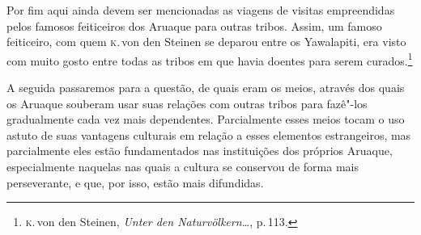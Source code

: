 Por fim aqui ainda devem ser mencionadas as viagens de visitas
empreendidas pelos famosos feiticeiros dos Aruaque para outras tribos.
Assim, um famoso feiticeiro, com quem \textsc{k}.\,von den Steinen se deparou
entre os Yawalapiti, era visto com muito gosto entre todas as tribos em
que havia doentes para serem curados.\footnote{\textsc{k}.\,von den Steinen,
  \textit{Unter den Naturvölkern\ldots}, p.\,113.}


A seguida passaremos para a questão, de quais eram os meios, através dos
quais os Aruaque souberam usar suas relações com outras tribos para
fazê"-los gradualmente cada vez mais dependentes. Parcialmente esses
meios tocam o uso astuto de suas vantagens culturais em relação a esses
elementos estrangeiros, mas parcialmente eles estão fundamentados nas
instituições dos próprios Aruaque, especialmente naquelas nas quais a
cultura se conservou de forma mais perseverante, e que, por isso, estão
mais difundidas.

